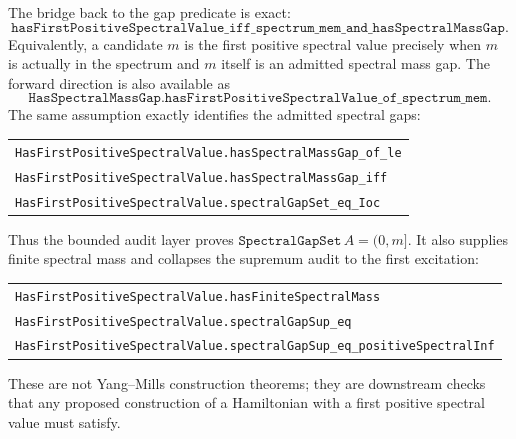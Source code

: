 \documentclass[11pt]{article}
\newcommand{\lean}[1]{\texttt{#1}}
\newcommand{\leansmall}[1]{{\small\texttt{#1}}}
\begin{document}
The bridge back to the gap predicate is exact:
\[
  \lean{hasFirstPositiveSpectralValue\_iff\_spectrum\_mem\_and\_hasSpectralMassGap}.
\]
Equivalently, a candidate \(m\) is the first positive spectral value precisely
when \(m\) is actually in the spectrum and \(m\) itself is an admitted spectral
mass gap.  The forward direction is also available as
\[
  \lean{HasSpectralMassGap.hasFirstPositiveSpectralValue\_of\_spectrum\_mem}.
\]
The same assumption exactly identifies the admitted spectral gaps:
\begin{center}
\begin{tabular}{l}
\leansmall{HasFirstPositiveSpectralValue.hasSpectralMassGap\_of\_le}\\
\leansmall{HasFirstPositiveSpectralValue.hasSpectralMassGap\_iff}\\
\leansmall{HasFirstPositiveSpectralValue.spectralGapSet\_eq\_Ioc}
\end{tabular}
\end{center}
Thus the bounded audit layer proves
\(\lean{SpectralGapSet}\,A=(0,m]\).  It also supplies finite spectral mass and
collapses the supremum audit to the first excitation:
\begin{center}
\begin{tabular}{l}
\leansmall{HasFirstPositiveSpectralValue.hasFiniteSpectralMass}\\
\leansmall{HasFirstPositiveSpectralValue.spectralGapSup\_eq}\\
\leansmall{HasFirstPositiveSpectralValue.spectralGapSup\_eq\_positiveSpectralInf}
\end{tabular}
\end{center}
These are not Yang--Mills construction theorems; they are downstream checks
that any proposed construction of a Hamiltonian with a first positive spectral
value must satisfy.
\end{document}
